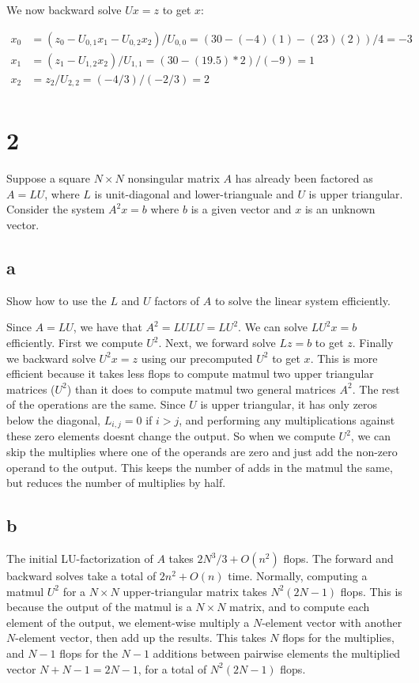 \documentclass[11pt]{article}
\begin{document}
We now backward solve $Ux = z$ to get $x$:

\begin{align*}
  x_0 &= (z_0 - U_{0,1} x_1 - U_{0,2} x_2) / U_{0,0} = (30 - (-4) (1) - (23) (2)) / 4 = -3 \\
  x_1 &= (z_1 - U_{1,2} x_2) / U_{1,1} = (30 - (19.5) *2) / (-9) = 1 \\
  x_2 &= z_2 / U_{2,2} = (-4/3) / (-2/3) = 2 \\
\end{align*}


\section{2}

Suppose a square $N \times N$ nonsingular matrix $A$ has already been factored as $A = LU$, where $L$ is unit-diagonal and lower-trianguale and $U$ is upper triangular. Consider the system $A^2x = b$ where $b$ is a given vector and $x$ is an unknown vector.

\subsection{a}

Show how to use the $L$ and $U$ factors of $A$ to solve the linear system efficiently.

Since $A = LU$, we have that $A^2 = LULU = LU^2$. We can solve $LU^2x = b$ efficiently. First we compute $U^2$. Next, we forward solve $Lz = b$ to get $z$. Finally we backward solve $U^2x = z$ using our precomputed $U^2$ to get $x$. This is more efficient because it takes less flops to compute matmul two upper triangular matrices ($U^2$) than it does to compute matmul two general matrices $A^2$. The rest of the operations are the same. Since $U$ is upper triangular, it has only zeros below the diagonal, $L_{i,j} = 0$ if $i > j$, and performing any multiplications against these zero elements doesnt change the output. So when we compute $U^2$, we can skip the multiplies where one of the operands are zero and just add the non-zero operand to the output. This keeps the number of adds in the matmul the same, but reduces the number of multiplies by half.

\subsection{b}

The initial LU-factorization of $A$ takes $2N^3/3 + O(n^2)$ flops. The forward and backward solves take a total of $2n^2 + O(n)$ time. Normally, computing a matmul $U^2$ for a $N \times N$ upper-triangular matrix takes $N^2 (2N - 1)$ flops. This is because the output of the matmul is a $N \times N$ matrix, and to compute each element of the output, we element-wise multiply a $N$-element vector with another $N$-element vector, then add up the results. This takes $N$ flops for the multiplies, and $N - 1$ flops for the $N-1$ additions between pairwise elements the multiplied vector $N + N - 1 = 2N - 1$, for a total of $N^2 (2N - 1)$ flops.
\end{document}
